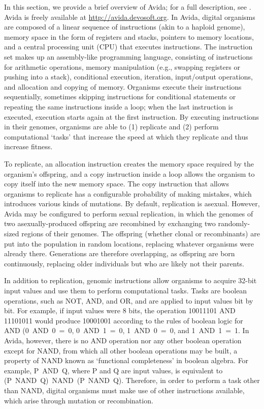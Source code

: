 \begin{doublespace}
In this section, we provide a brief overview of Avida;
for a full description, see \cite{ofr04}.
%
Avida is freely available at \url{http://avida.devosoft.org}.
%
In Avida, digital organisms are composed of
a linear sequence of instructions (akin to a haploid genome),
memory space in the form of registers and stacks,
pointers to memory locations,
and a central processing unit (CPU) that executes instructions.
%
The instruction set makes up an assembly-like programming language,
consisting of instructions for arithmetic operations,
memory manipulation (e.g., swapping registers or pushing into a stack),
conditional execution, iteration, input/output operations,
and allocation and copying of memory.
%
Organisms execute their instructions sequentially,
sometimes skipping instructions for conditional statements
or repeating the same instructions inside a loop;
when the last instruction is executed,
execution starts again at the first instruction.
%
By executing instructions in their genomes,
organisms are able to (1) replicate and (2) perform computational `tasks'
that increase the speed at which they replicate and thus increase fitness.



To replicate, an allocation instruction creates the memory space
required by the organism's offspring, and a copy instruction inside a loop
allows the organism to copy itself into the new memory space.
%
The copy instruction that allows organisms to replicate
has a configurable probability of making mistakes,
which introduces various kinds of mutations.
%
By default, replication is asexual.
%
However, Avida may be configured to perform sexual replication,
in which the genomes of two asexually-produced offspring are recombined
by exchanging two randomly-sized regions of their genomes.
%
The offspring (whether clonal or recombinants) are put into the population
in random locations, replacing whatever organisms were already there.
%
Generations are therefore overlapping, as offspring are born continuously,
replacing older individuals but who are likely not their parents.



In addition to replication, genomic instructions allow organisms
to acquire 32-bit input values and use them to perform computational tasks.
%
Tasks are boolean operations, such as NOT, AND, and OR,
and are applied to input values bit by bit.
%
For example, if input values were 8 bits,
the operation 10011101 AND 11101011 would produce 10001001
according to the rules of boolean logic for AND
(0~AND~0~=~0, 0~AND~1~=~0, 1~AND~0~=~0, and 1~AND~1~=~1.
%
In Avida, however, there is no AND operation nor any other boolean operation
except for NAND, from which all other boolean operations may be built,
a property of NAND known as `functional completeness' in boolean algebra.
%
For example, P~AND~Q, where P and Q are input values,
is equivalent to (P~NAND~Q)~NAND~(P~NAND~Q).
%
Therefore, in order to perform a task other than NAND,
digital organisms must make use of other instructions available,
which arise through mutation or recombination.




\end{doublespace}
